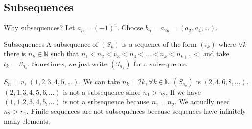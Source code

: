 \documentclass{report}
\begin{document}
\begin{topic}
    \section{Subsequences}
\end{topic}

Why subsequences? Let $a_{n} = (-1)^{n}$. Choose $b_{n} = a_{2n} = (a_{2}, a_{4}, \ldots )$.

\begin{definition}{Subsequences}
    A subsequence of $(S_{n})$ is a sequence of the form $(t_{k})$ where $\forall k$ there is $n_{k} \in \mathbb{N}$ such that $n_{1} < n_{2} < n_{3} < n_{4} <  \ldots  < n_{k} < n_{k + 1} < $ and take $t_{k} = S_{n_{k}}$. Sometimes, we just write $(S_{n_{k}})$ for a subsequence.
\end{definition}
    \begin{examples}
        \begin{example}
            $S_{n} = n$, $(1, 2, 3, 4, 5, \ldots )$. We can take $n_{k} = 2k, \forall k \in \mathbb{N}$ $(S_{n_{k}})$ is $(2, 4, 6, 8, \ldots )$. $(2, 1, 3, 4, 5, 6, \ldots)$ is not a subsequence since $n_{1} > n_{2}$. If we have $(1, 1, 2, 3, 4, 5, \ldots )$ is not a subsequence because $n_{1} = n_{2}$. We actually need $n_{2} > n_{1}$. Finite sequences are not subsequences because sequences have infinitely many elements.
        \end{example}
    \end{examples}
\end{document}
